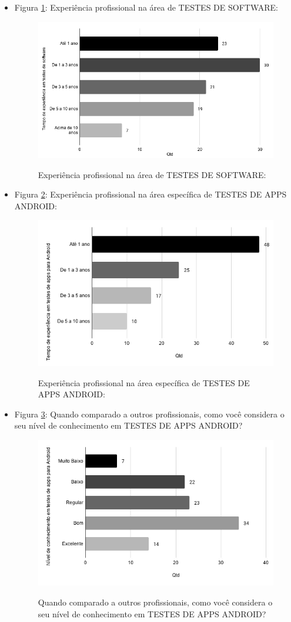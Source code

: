 \begin{itemize}
    \item Figura \ref{figure:s_experienciatestes}: Experiência profissional na área de TESTES DE SOFTWARE:
    \begin{figure}[!htb]
    \centering
    \includegraphics[width=.55\textwidth]{images/s_experienciatestes.png}
    \label{figure:s_experienciatestes}
    \caption{Experiência profissional na área de TESTES DE SOFTWARE:}
    \end{figure}
    

    \item Figura \ref{figure:s_experienciatestesandroid}: Experiência profissional na área específica de TESTES DE APPS ANDROID:
    \begin{figure}[!htb]
    \centering
    \includegraphics[width=.55\textwidth]{images/s_experienciatestesandroid.png}
    \label{figure:s_experienciatestesandroid}
    \caption{Experiência profissional na área específica de TESTES DE APPS ANDROID:}
    \end{figure}
    
    
     \item Figura \ref{figure:s_conhecimentotestesandroid}: Quando comparado a outros profissionais, como você considera o seu nível de conhecimento em TESTES DE APPS ANDROID?
    \begin{figure}[!htb]
    \centering
    \includegraphics[width=.55\textwidth]{images/s_conhecimentotestesandroid.png}
    \label{figure:s_conhecimentotestesandroid}
    \caption{Quando comparado a outros profissionais, como você considera o seu nível de conhecimento em TESTES DE APPS ANDROID?}
    \end{figure}   
    

\end{itemize}
